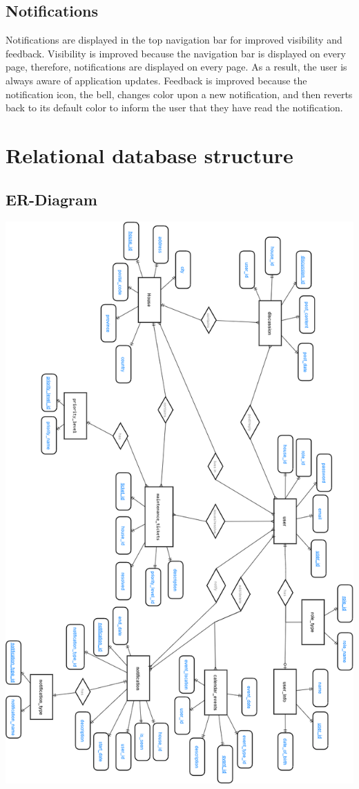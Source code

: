 \documentclass[12pt]{article}
\begin{document}
\subsection{Notifications}
Notifications are displayed in the top navigation bar for improved visibility and feedback. Visibility is improved because the navigation bar is displayed on every page, therefore, notifications are displayed on every page. As a result, the user is always aware of application updates. Feedback is improved because the notification icon, the bell, changes color upon a new notification, and then reverts back to its default color to inform the user that they have read the notification.

\section{Relational database structure}
\subsection{ER-Diagram}
\includegraphics[scale=0.5, keepaspectratio]{images/ER_Diagram.png}
\end{document}

